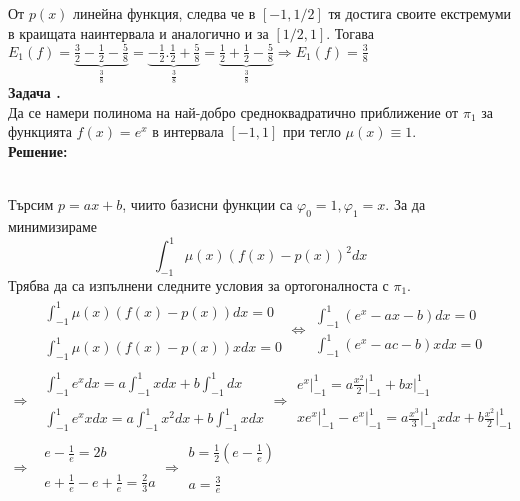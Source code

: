 \documentclass[12pt]{article}
\newcounter{problem}
\newcounter{solution}
\newcommand\problem{%
  \stepcounter{problem}%
  \textbf{Задача \theproblem.}~%
  \\
}
\newcommand\solution{%
  \textbf{Решение:}\\~%
}
\begin{document}
От $p(x)$ линейна функция, следва че в $[-1,1/2]$ тя достига своите екстремуми в краищата наинтервала и аналогично и за $[1/2,1]$.
Тогава $E_1(f) = \underbrace{\frac{3}{2} -\frac{1}{2} - \frac{5}{8}}_{\frac{3}{8}} = \underbrace{-\frac{1}{2}.\frac{1}{2} + \frac{5}{8}}_\frac{3}{8} = \underbrace{\frac{1}{2} + \frac{1}{2} - \frac{5}{8}}_\frac{3}{8}\Rightarrow E_1(f)=\frac{3}{8}$\\
\problem
Да се намери полинома на най-добро средноквадратично приближение от $\pi_1$ за функцията $f(x) = e^x$ в интервала $[-1,1]$ при тегло $\mu(x)\equiv1.$\\
\solution
Търсим $p=ax+b$, чиито базисни функции са $\varphi_0=1, \varphi_1=x$.
За да минимизираме
\begin{equation*}
\int_{-1}^{1}\mu(x)(f(x)-p(x))^2dx
\end{equation*}
Трябва да са изпълнени следните условия за ортогоналноста с $\pi_1$.
\begin{align*}
&\begin{array}{|c}
\int_{-1}^{1}\mu(x)(f(x)-p(x))dx = 0\\
\\
\int_{-1}^{1}\mu(x)(f(x)-p(x))xdx = 0
\end{array}
\Leftrightarrow
\begin{array}{|c}
\int_{-1}^{1}(e^x-ax - b)dx = 0\\
\int_{-1}^{1}(e^x -ac - b)xdx = 0 
\end{array}\\
\Rightarrow
&\begin{array}{|c}
\int_{-1}^{1}e^xdx = a\int_{-1}^{1}xdx+b\int_{-1}^{1}dx\\
\\
\int_{-1}^{1}e^xxdx = a\int_{-1}^{1}x^2dx+b\int_{-1}^{1}xdx
\end{array}
\Rightarrow
\begin{array}{|c}
e^x\rvert_{-1}^{1} = a\frac{x^2}{2}\rvert_{-1}^{1}+bx\rvert_{-1}^{1}\\
\\
xe^x\rvert_{-1}^{1} - e^x\rvert_{-1}^{1} = a\frac{x^3}{3}\rvert_{-1}^{1}xdx+b\frac{x^2}{2}\rvert_{-1}^{1}
\end{array}\\
\Rightarrow
&\begin{array}{|c}
e-\frac{1}{e}=2b\\
\\
e + \frac{1}{e} - e + \frac{1}{e} = \frac{2}{3}a
\end{array}
\Rightarrow
\boxed{\begin{array}{|c}
b = \frac{1}{2}\left(e-\frac{1}{e}\right)\\
\\
a = \frac{3}{e}
\end{array}}
\end{align*}
\end{document}
